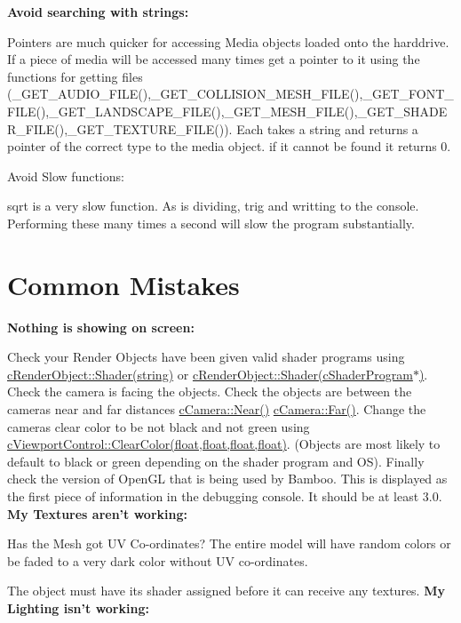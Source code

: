  {\bfseries Avoid searching with strings:} \par
 Pointers are much quicker for accessing Media objects loaded onto the harddrive. If a piece of media will be accessed many times get a pointer to it using the functions for getting files (\_\-GET\_\-AUDIO\_\-FILE(),\_\-GET\_\-COLLISION\_\-MESH\_\-FILE(),\_\-GET\_\-FONT\_\-FILE(),\_\-GET\_\-LANDSCAPE\_\-FILE(),\_\-GET\_\-MESH\_\-FILE(),\_\-GET\_\-SHADER\_\-FILE(),\_\-GET\_\-TEXTURE\_\-FILE()). Each takes a string and returns a pointer of the correct type to the media object. if it cannot be found it returns 0. \par
 Avoid Slow functions: \par
 sqrt is a very slow function. As is dividing, trig and writting to the console. Performing these many times a second will slow the program substantially. \hypertarget{_reference_lists_CommonMistakes}{}\section{Common Mistakes}\label{_reference_lists_CommonMistakes}
{\bfseries  Nothing is showing on screen: } \par
 Check your Render Objects have been given valid shader programs using \hyperlink{classc_render_object_a75f92ce4ba7b36a07e24be0643e4f020}{cRenderObject::Shader(string)} or \hyperlink{classc_render_object_abd47a58de22adfe1e9a1970f66a2f4cd}{cRenderObject::Shader(cShaderProgram$\ast$)}. Check the camera is facing the objects. Check the objects are between the cameras near and far distances \hyperlink{classc_perspective_control_af4c9bf530c680788925079d1ed64f7db}{cCamera::Near()} \hyperlink{classc_perspective_control_aa2a129ba8718923f805335bdb7661f40}{cCamera::Far()}. Change the cameras clear color to be not black and not green using \hyperlink{classc_viewport_control_ac3cee84c15d6b7bb35daf33a95a41f08}{cViewportControl::ClearColor(float,float,float,float)}. (Objects are most likely to default to black or green depending on the shader program and OS). Finally check the version of OpenGL that is being used by Bamboo. This is displayed as the first piece of information in the debugging console. It should be at least 3.0. {\bfseries  My Textures aren't working: } \par
 Has the Mesh got UV Co-\/ordinates? The entire model will have random colors or be faded to a very dark color without UV co-\/ordinates. \par
 The object must have its shader assigned before it can receive any textures. {\bfseries  My Lighting isn't working: } \par
